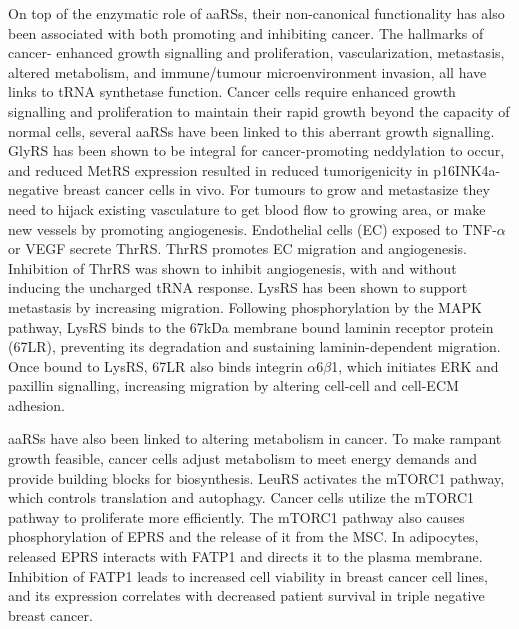 On top of the enzymatic role of aaRSs, their non-canonical functionality has also been associated with both promoting and inhibiting cancer.
The hallmarks of cancer- enhanced growth signalling and proliferation, vascularization, metastasis, altered metabolism, and immune/tumour microenvironment invasion, all have links to tRNA synthetase function.
Cancer cells require enhanced growth signalling and proliferation to maintain their rapid growth beyond the capacity of normal cells, several aaRSs have been linked to this aberrant growth signalling.
GlyRS has been shown to be integral for cancer-promoting neddylation to occur, and reduced MetRS expression resulted in reduced tumorigenicity in p16INK4a-negative breast cancer cells in vivo\cite{mo2016neddylation, deng2020role, kwon2018stabilization}.
For tumours to grow and metastasize they need to hijack existing vasculature to get blood flow to growing area, or make new vessels by promoting angiogenesis.
Endothelial cells (EC) exposed to TNF-$\alpha$ or VEGF secrete ThrRS.
ThrRS promotes EC migration and angiogenesis.
Inhibition of ThrRS was shown to inhibit angiogenesis, with and without inducing the uncharged tRNA response\cite{williams2013secreted, mirando2015aminoacyl}.
LysRS has been shown to support metastasis by increasing migration.
Following phosphorylation by the MAPK pathway, LysRS binds to the 67kDa membrane bound laminin receptor protein (67LR), preventing its degradation and sustaining laminin-dependent migration.
Once bound to LysRS, 67LR also binds integrin $\alpha$6$\beta$1, which initiates ERK and paxillin signalling, increasing migration by altering cell-cell and cell-ECM adhesion.

aaRSs have also been linked to altering metabolism in cancer.
To make rampant growth feasible, cancer cells adjust metabolism to meet energy demands and provide building blocks for biosynthesis.
LeuRS activates the mTORC1 pathway, which controls translation and autophagy.
Cancer cells utilize the mTORC1 pathway to proliferate more efficiently.
The mTORC1 pathway also causes phosphorylation of EPRS and the release of it from the MSC.
In adipocytes, released EPRS interacts with FATP1 and directs it to the plasma membrane.
Inhibition of FATP1 leads to increased cell viability in breast cancer cell lines, and its expression correlates with decreased patient survival in triple negative breast cancer\cite{mendes2019unraveling}.

